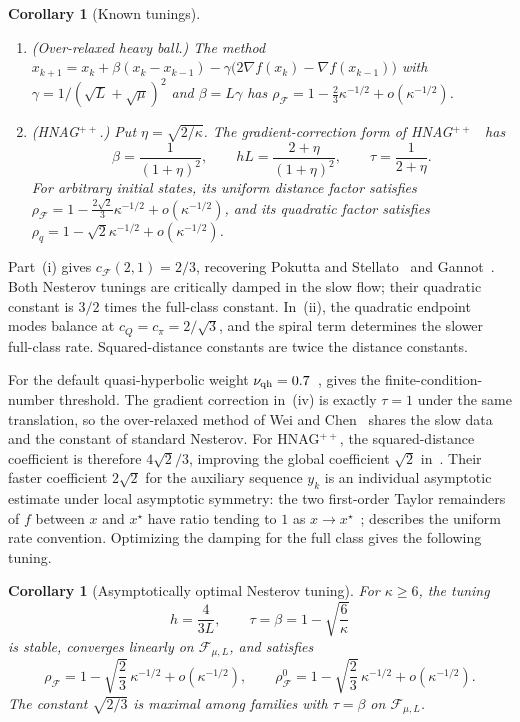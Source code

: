 \documentclass[11pt]{article}
\newtheorem{corollary}[theorem]{Corollary}
\theoremstyle{definition}
\theoremstyle{remark}
\newcommand{\cF}{\mathcal F}
\newcommand{\rhoF}{\rho_{\cF}}
\newcommand{\rhoz}{\rho_{\cF}^{0}}
\newcommand{\cQ}{c_{Q}}
\newcommand{\cFF}{c_{\cF}}
\newcommand{\cpi}{c_{\pi}}
\begin{document}
\begin{corollary}[Known tunings]
\begin{enumerate}[label=\textup{(\roman*)}]
\item \textup{(Over-relaxed heavy ball.)}  The method
\(x_{k+1}=x_k+\beta(x_k-x_{k-1})-\gamma\bigl(2\nabla f(x_k)-\nabla f(x_{k-1})\bigr)\) with \(\gamma=1/(\sqrt L+\sqrt\mu)^2\) and
\(\beta=L\gamma\) has \(\rhoF=1-\frac23\kappa^{-1/2}+o(\kappa^{-1/2})\).
\item \textup{(HNAG\(^{++}\).)}  Put \(\eta=\sqrt{2/\kappa}\).
The gradient-correction form of HNAG\(^{++}\)~\cite{CX26} has
\[
\beta=\frac1{(1+\eta)^2},\qquad hL=\frac{2+\eta}{(1+\eta)^2},\qquad \tau=\frac1{2+\eta}.
\]
For arbitrary initial states, its uniform distance factor satisfies
\(\rhoF=1-\frac{2\sqrt2}{3}\kappa^{-1/2}+o(\kappa^{-1/2})\), and its quadratic factor satisfies
\(\rho_q=1-\sqrt2\kappa^{-1/2}+o(\kappa^{-1/2})\).
\end{enumerate}
\end{corollary}

Part~(i) gives \(\cFF(2,1)=2/3\), recovering Pokutta and Stellato~\cite{PS26} and
Gannot~\cite{Gan22}.  Both Nesterov tunings are critically damped in the slow flow;
their quadratic constant is \(3/2\) times the full-class constant.
In~(ii), the quadratic endpoint modes balance at \(\cQ=\cpi=2/\sqrt3\),
and the spiral term determines the slower full-class rate.
Squared-distance constants are twice the distance constants.

For the default quasi-hyperbolic weight \(\nu_{\rm qh}=0.7\)~\cite{MY19},
 gives the finite-condition-number threshold.
The gradient correction in~(iv) is exactly \(\tau=1\) under the same translation, so the over-relaxed
method of Wei and Chen~\cite{WC25} shares the slow data and the constant of standard Nesterov.
For HNAG\(^{++}\), the squared-distance coefficient is therefore \(4\sqrt2/3\), improving the global
coefficient \(\sqrt2\) in~\cite[Theorem~5.1]{CX26}.  Their faster coefficient \(2\sqrt2\) for the auxiliary sequence \(y_k\) is an individual
asymptotic estimate under local asymptotic symmetry: the two first-order Taylor
remainders of \(f\) between \(x\) and \(x^\star\) have ratio tending to \(1\) as
\(x\to x^\star\)~\cite[Theorem~5.2]{CX26};
 describes the uniform rate convention.
Optimizing the damping for the full class gives the following tuning.

\begin{corollary}[Asymptotically optimal Nesterov tuning]\label{cor:nag-asymptotic-optimal}
For \(\kappa\ge6\), the tuning
\[
h=\frac4{3L},\qquad \tau=\beta=1-\sqrt{\frac6\kappa}
\]
is stable, converges linearly on \(\cF_{\mu,L}\), and satisfies
\[
\rhoF=1-\sqrt{\frac23}\,\kappa^{-1/2}+o(\kappa^{-1/2}),\qquad
\rhoz=1-\sqrt{\frac23}\,\kappa^{-1/2}+o(\kappa^{-1/2}).
\]
The constant \(\sqrt{2/3}\) is maximal among families with \(\tau=\beta\) on \(\cF_{\mu,L}\).
\end{corollary}
\end{document}
